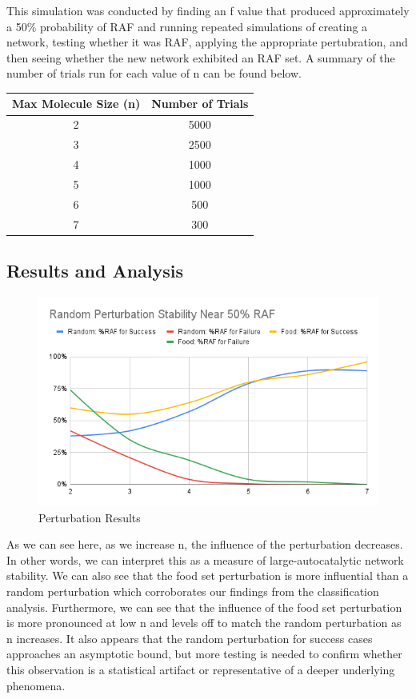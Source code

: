 \documentclass[11pt]{article}
\begin{document}
This simulation was conducted by finding an f value that produced approximately a 50\% probability of RAF and running repeated simulations of creating a network, testing whether it was RAF, applying the appropriate pertubration, and then seeing whether the new network exhibited an RAF set. 
A summary of the number of trials run for each value of n can be found below.

\begin{table}[h!]
    \centering
     \begin{tabular}{||c| c||} 
     \hline
     Max Molecule Size (n) & Number of Trials \\ [0.5ex] 
     \hline\hline
     2 & 5000 \\ 
     3 & 2500 \\
     4 & 1000 \\
     5 & 1000 \\
     6 & 500 \\
     7 & 300 \\ [1ex] 
     \hline
    \end{tabular}
\end{table}

\subsection*{Results and Analysis} 

\begin{figure}[H]
    \centering
    \includegraphics[width=15cm]{perturbation}
    \caption{Perturbation Results}
\end{figure}

As we can see here, as we increase n, the influence of the perturbation decreases. In other words, we can interpret this as a measure of large-autocatalytic network stability. 
We can also see that the food set perturbation is more influential than a random perturbation which corroborates our findings from the classification analysis. 
Furthermore, we can see that the influence of the food set perturbation is more pronounced at low n and levels off to match the random perturbation as n increases. 
It also appears that the random perturbation for success cases approaches an asymptotic bound, but more testing is needed to confirm whether this observation is a statistical artifact or representative of a deeper underlying phenomena.
\end{document}
